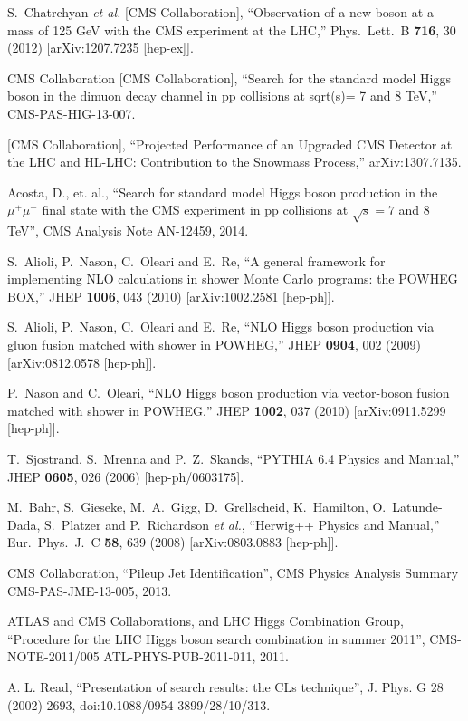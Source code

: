 \documentclass[12pt]{article}
\begin{document}
\begin{thebibliography}{9}

  S.~Chatrchyan {\it et al.}  [CMS Collaboration],
  ``Observation of a new boson at a mass of 125 GeV with the CMS experiment at the LHC,''
  Phys.\ Lett.\ B {\bf 716}, 30 (2012)
  [arXiv:1207.7235 [hep-ex]].

  CMS Collaboration [CMS Collaboration],
  ``Search for the standard model Higgs boson in the dimuon decay channel in pp collisions at sqrt(s)= 7 and 8 TeV,''
  CMS-PAS-HIG-13-007.

  [CMS Collaboration],
  ``Projected Performance of an Upgraded CMS Detector at the LHC and HL-LHC: Contribution to the Snowmass Process,''
  arXiv:1307.7135.


  Acosta, D., et. al.,
  ``Search for standard model Higgs boson production in the $\mu^+\mu^-$ final state with the CMS experiment in pp collisions at $\sqrt{s}=7$ and 8\, TeV'',
  CMS Analysis Note AN-12459,
  2014.

  S.~Alioli, P.~Nason, C.~Oleari and E.~Re,
  ``A general framework for implementing NLO calculations in shower Monte Carlo programs: the POWHEG BOX,''
  JHEP {\bf 1006}, 043 (2010)
  [arXiv:1002.2581 [hep-ph]].

  S.~Alioli, P.~Nason, C.~Oleari and E.~Re,
  ``NLO Higgs boson production via gluon fusion matched with shower in POWHEG,''
  JHEP {\bf 0904}, 002 (2009)
  [arXiv:0812.0578 [hep-ph]].

  P.~Nason and C.~Oleari,
  ``NLO Higgs boson production via vector-boson fusion matched with shower in POWHEG,''
  JHEP {\bf 1002}, 037 (2010)
  [arXiv:0911.5299 [hep-ph]].

  T.~Sjostrand, S.~Mrenna and P.~Z.~Skands,
  ``PYTHIA 6.4 Physics and Manual,''
  JHEP {\bf 0605}, 026 (2006)
  [hep-ph/0603175].

  M.~Bahr, S.~Gieseke, M.~A.~Gigg, D.~Grellscheid, K.~Hamilton, O.~Latunde-Dada, S.~Platzer and P.~Richardson {\it et al.},
  ``Herwig++ Physics and Manual,''
  Eur.\ Phys.\ J.\ C {\bf 58}, 639 (2008)
  [arXiv:0803.0883 [hep-ph]].

  CMS Collaboration, ``Pileup Jet Identification'', 
  CMS Physics Analysis Summary CMS-PAS-JME-13-005, 
  2013.

  ATLAS and CMS Collaborations, and LHC Higgs Combination Group, ``Procedure for
  the LHC Higgs boson search combination in summer 2011'', 
  CMS-NOTE-2011/005 ATL-PHYS-PUB-2011-011, 2011.

  A. L. Read, ``Presentation of search results: the CLs technique'', J. Phys. G 28 (2002) 2693,
  doi:10.1088/0954-3899/28/10/313.

\end{thebibliography}
\end{document}
